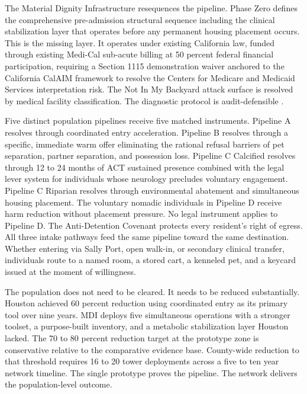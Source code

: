 \documentclass[12pt, letterpaper]{article}
\begin{document}
The Material Dignity Infrastructure resequences the pipeline. Phase Zero defines the comprehensive pre-admission structural sequence including the clinical stabilization layer that operates before any permanent housing placement occurs. This is the missing layer. It operates under existing California law, funded through existing Medi-Cal sub-acute billing at 50 percent federal financial participation, requiring a Section 1115 demonstration waiver anchored to the California CalAIM framework \citep{calaim_1115_waiver_2023} to resolve the Centers for Medicare and Medicaid Services interpretation risk. The Not In My Backyard attack surface is resolved by medical facility classification. The diagnostic protocol is audit-defensible \citep{dhcs_mhrc_2024}.

Five distinct population pipelines receive five matched instruments. Pipeline A resolves through coordinated entry acceleration. Pipeline B resolves through a specific, immediate warm offer eliminating the rational refusal barriers of pet separation, partner separation, and possession loss. Pipeline C Calcified resolves through 12 to 24 months of ACT sustained presence combined with the legal lever system for individuals whose neurology precludes voluntary engagement. Pipeline C Riparian resolves through environmental abatement and simultaneous housing placement. The voluntary nomadic individuals in Pipeline D receive harm reduction without placement pressure. No legal instrument applies to Pipeline D. The Anti-Detention Covenant protects every resident's right of egress. All three intake pathways feed the same pipeline toward the same destination. Whether entering via Sally Port, open walk-in, or secondary clinical transfer, individuals route to a named room, a stored cart, a kenneled pet, and a keycard issued at the moment of willingness.

The population does not need to be cleared. It needs to be reduced substantially. Houston achieved 60 percent reduction using coordinated entry as its primary tool over nine years. MDI deploys five simultaneous operations with a stronger toolset, a purpose-built inventory, and a metabolic stabilization layer Houston lacked. The 70 to 80 percent reduction target at the prototype zone is conservative relative to the comparative evidence base. County-wide reduction to that threshold requires 16 to 20 tower deployments across a five to ten year network timeline. The single prototype proves the pipeline. The network delivers the population-level outcome.
\end{document}
